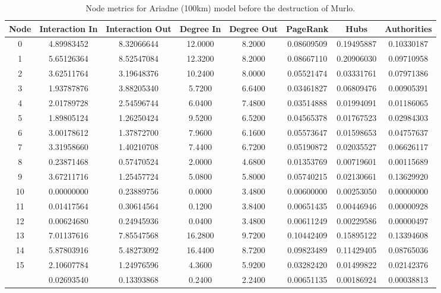 \documentclass[12pt,a4paper]{thesis}
\begin{document}
\begin{table}[H]
\centering
\caption{Node metrics for Ariadne (100km) model before the destruction of Murlo.}
\tiny
\begin{tabular}{|c|c|c|c|c|c|c|c|}
\hline	Node	&	Interaction In	&	Interaction Out	&	Degree In	&	Degree Out	&	PageRank	&	Hubs	&	Authorities	\\
\hline	0	&	4.89983452	&	8.32066644	&	12.0000	&	8.2000	&	0.08609509	&	0.19495887	&	0.10330187	\\
\hline	1	&	5.65126364	&	8.52547084	&	12.3200	&	8.2000	&	0.08667110	&	0.20906030	&	0.09710958	\\
\hline	2	&	3.62511764	&	3.19648376	&	10.2400	&	8.0000	&	0.05521474	&	0.03331761	&	0.07971386	\\
\hline	3	&	1.93787876	&	3.88205340	&	5.7200	&	6.6400	&	0.03461827	&	0.06809476	&	0.00905391	\\
\hline	4	&	2.01789728	&	2.54596744	&	6.0400	&	7.4800	&	0.03514888	&	0.01994091	&	0.01186065	\\
\hline	5	&	1.89805124	&	1.26250424	&	9.5200	&	6.5200	&	0.04565378	&	0.01767523	&	0.02984303	\\
\hline	6	&	3.00178612	&	1.37872700	&	7.9600	&	6.1600	&	0.05573647	&	0.01598653	&	0.04757637	\\
\hline	7	&	3.31958660	&	1.40210708	&	7.4400	&	6.7200	&	0.05190872	&	0.02035527	&	0.06626117	\\
\hline	8	&	0.23871468	&	0.57470524	&	2.0000	&	4.6800	&	0.01353769	&	0.00719601	&	0.00115689	\\
\hline	9	&	3.67211716	&	1.25457724	&	5.0800	&	5.8000	&	0.05740215	&	0.02130661	&	0.13629920	\\
\hline	10	&	0.00000000	&	0.23889756	&	0.0000	&	3.4800	&	0.00600000	&	0.00253050	&	0.00000000	\\
\hline	11	&	0.01417564	&	0.30614564	&	0.1200	&	3.8400	&	0.00651435	&	0.00446946	&	0.00000928	\\
\hline	12	&	0.00624680	&	0.24945936	&	0.0400	&	3.4800	&	0.00611249	&	0.00229586	&	0.00000497	\\
\hline	13	&	7.01137616	&	7.85547568	&	16.2800	&	9.7200	&	0.10442409	&	0.15895122	&	0.13394608	\\
\hline	14	&	5.87803916	&	5.48273092	&	16.4400	&	8.7200	&	0.09823489	&	0.11429405	&	0.08765036	\\
\hline	15	&	2.10607784	&	1.24976596	&	4.3600	&	5.9200	&	0.03282420	&	0.01499822	&	0.02142376	\\
\rowcolor{yellow}
\hline	16	&	0.02693540	&	0.13393868	&	0.2400	&	2.2400	&	0.00651135	&	0.00186924	&	0.00038813	\\

\end{tabular}
\end{table}
\end{document}
